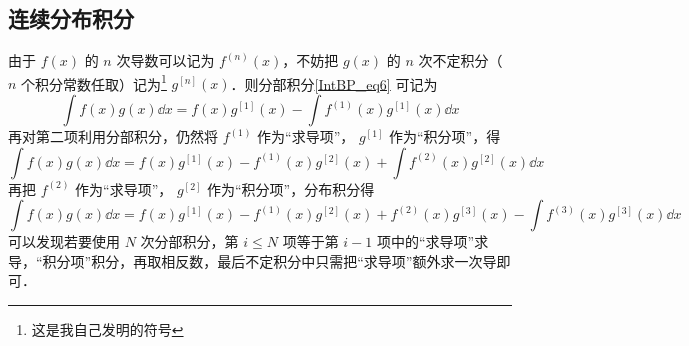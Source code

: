 \subsection{连续分布积分}
由于 $f(x)$ 的 $n$ 次导数可以记为 ${f^{(n)}}(x)$，不妨把 $g(x)$ 的 $n$ 次不定积分（ $n$ 个积分常数任取）记为\footnote{这是我自己发明的符号} ${g^{[n]}}(x)$．则分部积分\autoref{IntBP_eq6} 可记为
\begin{equation}
\int f(x)g(x) \dd{x}  = f(x){g^{[1]}}(x) - \int f^{(1)}(x) g^{[1]}(x) \dd{x}
\end{equation}
再对第二项利用分部积分，仍然将 ${f^{(1)}}$ 作为“求导项”， ${g^{[1]}}$ 作为“积分项”，得
\begin{equation}
\int f(x)g(x) \dd{x}  = f(x) g^{[1]}(x) - f^{(1)}(x) g^{[2]}(x) + \int f^{(2)}(x) g^{[2]}(x) \dd{x}
\end{equation}
再把 $f^{(2)}$ 作为“求导项”， $g^{[2]}$ 作为“积分项”，分布积分得
\begin{equation}
\int f(x)g(x) \dd{x} = f(x) g^{[1]}(x) - f^{(1)}(x) g^{[2]}(x) + f^{(2)}(x)g^{[3]}(x) - \int f^{(3)}(x) g^{[3]}(x) \dd{x}
\end{equation}
可以发现若要使用 $N$ 次分部积分，第 $i\le N$ 项等于第 $i-1$ 项中的“求导项”求导，“积分项”积分，再取相反数，最后不定积分中只需把“求导项”额外求一次导即可． 

